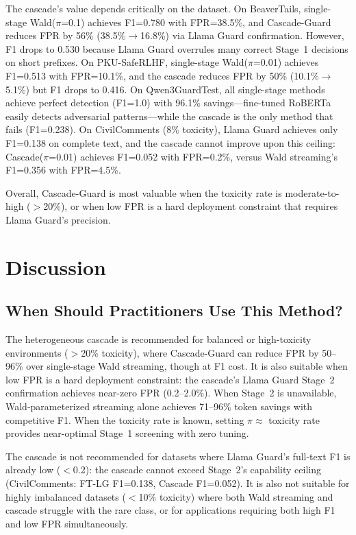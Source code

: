 \documentclass[acmtjournal, acmnowidth]{acmart}
\theoremstyle{definition}
\begin{document}
The cascade's value depends critically on the dataset. On BeaverTails, single-stage Wald($\pi$=0.1) achieves F1=0.780 with FPR=38.5\%, and Cascade-Guard reduces FPR by 56\% (38.5\%$\to$16.8\%) via Llama Guard confirmation. However, F1 drops to 0.530 because Llama Guard overrules many correct Stage~1 decisions on short prefixes. On PKU-SafeRLHF, single-stage Wald($\pi$=0.01) achieves F1=0.513 with FPR=10.1\%, and the cascade reduces FPR by 50\% (10.1\%$\to$5.1\%) but F1 drops to 0.416. On Qwen3GuardTest, all single-stage methods achieve perfect detection (F1=1.0) with 96.1\% savings---fine-tuned RoBERTa easily detects adversarial patterns---while the cascade is the only method that fails (F1=0.238). On CivilComments (8\% toxicity), Llama Guard achieves only F1=0.138 on complete text, and the cascade cannot improve upon this ceiling: Cascade($\pi$=0.01) achieves F1=0.052 with FPR=0.2\%, versus Wald streaming's F1=0.356 with FPR=4.5\%.

Overall, Cascade-Guard is most valuable when the toxicity rate is moderate-to-high ($>$20\%), or when low FPR is a hard deployment constraint that requires Llama Guard's precision.

\section{Discussion}

\subsection{When Should Practitioners Use This Method?}

The heterogeneous cascade is recommended for balanced or high-toxicity environments ($>$20\% toxicity), where Cascade-Guard can reduce FPR by 50--96\% over single-stage Wald streaming, though at F1 cost. It is also suitable when low FPR is a hard deployment constraint: the cascade's Llama Guard Stage~2 confirmation achieves near-zero FPR (0.2--2.0\%). When Stage~2 is unavailable, Wald-parameterized streaming alone achieves 71--96\% token savings with competitive F1. When the toxicity rate is known, setting $\pi \approx$ toxicity rate provides near-optimal Stage~1 screening with zero tuning.

The cascade is not recommended for datasets where Llama Guard's full-text F1 is already low ($<$0.2): the cascade cannot exceed Stage~2's capability ceiling (CivilComments: FT-LG F1=0.138, Cascade F1=0.052). It is also not suitable for highly imbalanced datasets ($<$10\% toxicity) where both Wald streaming and cascade struggle with the rare class, or for applications requiring both high F1 and low FPR simultaneously.
\end{document}
